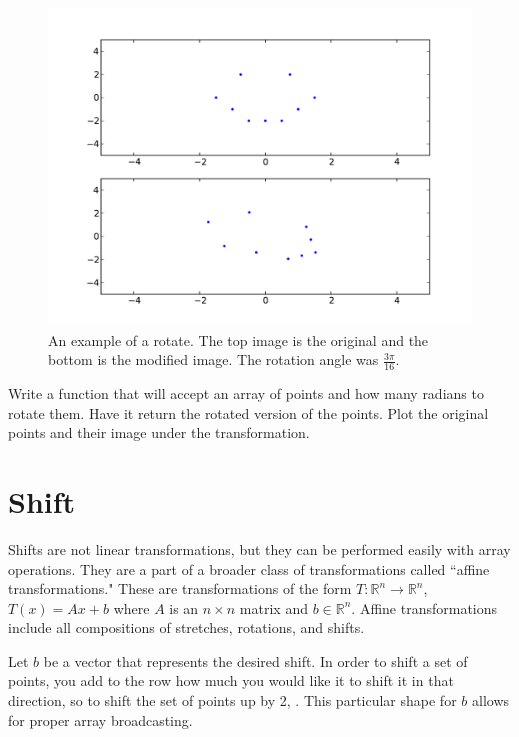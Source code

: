 \begin{figure}
\centering
\includegraphics[width=\textwidth]{rotate.pdf}
\caption{An example of a rotate. The top image is the original and the bottom is the modified image. The rotation angle was $\frac{3\pi}{16}$.}
\end{figure}

\begin{problem}
Write a function that will accept an array of points and how many radians to rotate them.
Have it return the rotated version of the points.
Plot the original points and their image under the transformation.
\end{problem}

\section*{Shift}

Shifts are not linear transformations, but they can be performed easily with array operations.
They are a part of a broader class of transformations called ``affine transformations."
These are transformations of the form $T: \mathbb{R}^n \to \mathbb{R}^n$, $T(x) = A x + b$ where $A$ is an $n\times n$ matrix and $b \in \mathbb{R}^n$.
Affine transformations include all compositions of stretches, rotations, and shifts.

Let $b$ be a vector that represents the desired shift.
In order to shift a set of points, you add to the row how much you would like it to shift it in that direction, so to shift the set of points up by 2, .
This particular shape for $b$ allows for proper array broadcasting.

